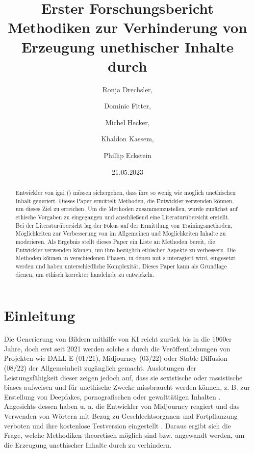 \documentclass[hidelinks,12pt]{report}
\title{Erster Forschungsbericht \\[1ex] \large Methodiken zur Verhinderung von  Erzeugung unethischer Inhalte durch \GLSabrev{igai}}
\date{21.05.2023}
\author{Ronja Drechsler, \and Dominic Fitter, \and Michel Hecker, \and Khaldon Kassem, \and Phillip Eckstein}
\begin{document}
\maketitle

\begin{abstract}
	Entwickler von \Gls{igai} () müssen sichergehen, dass ihre  so wenig wie möglich unethischen Inhalt generiert.
	Dieses Paper ermittelt Methoden, die Entwickler verwenden können, um dieses Ziel zu erreichen. 
	Um die Methoden zusammenzustellen, wurde zunächst auf ethische Vorgaben zu  eingegangen und anschließend eine Literaturübersicht erstellt. 
	Bei der Literaturübersicht lag der Fokus auf der Ermittlung von Trainingsmethoden, Möglichkeiten zur Verbesserung von  im Allgemeinen und Möglichkeiten Inhalte zu moderieren. 
	Als Ergebnis stellt dieses Paper ein Liste an Methoden bereit, die Entwickler verwenden können, um ihre  bezüglich ethischer Aspekte zu verbessern. 
	Die Methoden können in verschiedenen Phasen, in denen mit s interagiert wird, eingesetzt werden und haben unterschiedliche Komplexität. 
	Dieses Paper kann als Grundlage dienen, um ethisch korrekter handelnde  zu entwickeln.
\end{abstract}



\tableofcontents
\newpage
\printnoidxglossary
\newpage




\chapter{Einleitung}
Die Generierung von Bildern mithilfe von KI reicht zurück bis in die 1960er Jahre\cite{Garcia}, doch erst seit 2021 werden solche s durch die Veröffentlichungen von Projekten wie DALL-E (01/21), Midjourney (03/22) oder Stable Diffusion (08/22) der Allgemeinheit zugänglich gemacht. Auslotungen der Leistungsfähigkeit dieser  zeigen jedoch auf, dass sie sexistische oder rassistische \Gls{bias}es aufweisen \cite{Schmidt} und für unethische Zwecke missbraucht werden können, z. B. zur Erstellung von Deepfakes, pornografischen oder gewalttätigen Inhalten \cite{Hadero}.\\

Angesichts dessen haben u. a. die Entwickler von Midjourney reagiert und das Verwenden von Wörtern mit Bezug zu Geschlechtsorganen und Fortpflanzung verboten \cite{Heikkilae} und ihre kostenlose Testversion eingestellt \cite{NelsonMidjourney}. Daraus ergibt sich die Frage, welche Methodiken theoretisch möglich sind bzw. angewandt werden, um die Erzeugung unethischer Inhalte durch  zu verhindern.\\
\end{document}
